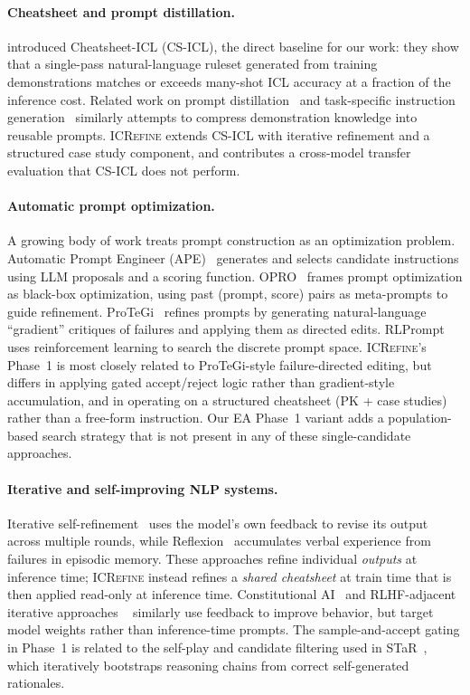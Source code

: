 \paragraph{Cheatsheet and prompt distillation.}
\citet{csicl2024} introduced Cheatsheet-ICL (CS-ICL), the direct baseline for our work:
they show that a single-pass natural-language ruleset generated from training demonstrations
matches or exceeds many-shot ICL accuracy at a fraction of the inference cost.
Related work on prompt distillation~\citep{li2023promptdistillation} and task-specific
instruction generation~\citep{ape2022,zhou2022large} similarly attempts to compress
demonstration knowledge into reusable prompts.
\textsc{ICRefine} extends CS-ICL with iterative refinement and a structured case study
component, and contributes a cross-model transfer evaluation that CS-ICL does not perform.

\paragraph{Automatic prompt optimization.}
A growing body of work treats prompt construction as an optimization problem.
Automatic Prompt Engineer (APE)~\citep{ape2022} generates and selects candidate
instructions using LLM proposals and a scoring function.
OPRO~\citep{opro2023} frames prompt optimization as black-box optimization, using
past (prompt, score) pairs as meta-prompts to guide refinement.
ProTeGi~\citep{pryzant2023protegi} refines prompts by generating natural-language ``gradient''
critiques of failures and applying them as directed edits.
RLPrompt~\citep{deng2022rlprompt} uses reinforcement learning to search the discrete prompt
space.
\textsc{ICRefine}'s Phase~1 is most closely related to ProTeGi-style failure-directed
editing, but differs in applying gated accept/reject logic rather than gradient-style
accumulation, and in operating on a structured cheatsheet (PK + case studies) rather than a
free-form instruction.
Our EA Phase~1 variant adds a population-based search strategy that is not present in any of
these single-candidate approaches.

\paragraph{Iterative and self-improving NLP systems.}
Iterative self-refinement~\citep{madaan2023selfrefine} uses the model's own feedback to
revise its output across multiple rounds, while Reflexion~\citep{shinn2023reflexion}
accumulates verbal experience from failures in episodic memory.
These approaches refine individual \emph{outputs} at inference time; \textsc{ICRefine}
instead refines a \emph{shared cheatsheet} at train time that is then applied
read-only at inference time.
Constitutional AI~\citep{bai2022constitutional} and RLHF-adjacent iterative approaches
~\citep{ouyang2022instructgpt} similarly use feedback to improve behavior, but target model
weights rather than inference-time prompts.
The sample-and-accept gating in Phase~1 is related to the self-play and candidate filtering
used in STaR~\citep{zelikman2022star}, which iteratively bootstraps reasoning chains from
correct self-generated rationales.

